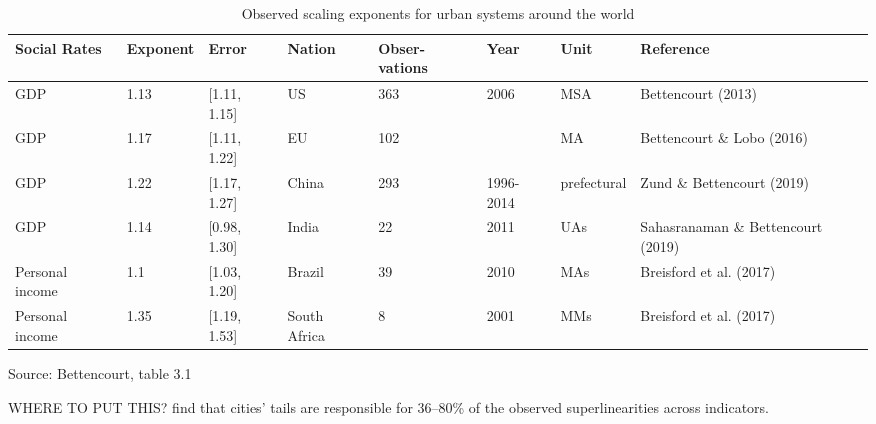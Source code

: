 \begin{table}[htb]\small
\centering
\begin{tabular}{|p{1.5cm}|l|l|p{1.5cm}|p{1.4cm}|p{}|l|p{2.5cm}|}\hline
\textbf{Social Rates} & \textbf{Exponent} & \textbf{Error} & \textbf{Nation} & \textbf{Obser-vations} & \textbf{Year} & \textbf{Unit} & \textbf{Reference} \\ \hline   
GDP             & 1.13 & [1.11, 1.15]  & US           & 363 & 2006        & MSA  & Bettencourt (2013)                 \\ \hline
GDP             & 1.17 & [1.11, 1.22]  & EU           & 102 &             & MA   & Bettencourt  \& Lobo        (2016) \\ \hline
GDP             & 1.22 & [1.17, 1.27]  & China        & 293 & 1996-2014   & prefectural & Zund  \& Bettencourt (2019) \\ \hline
GDP             & 1.14 & [0.98, 1.30]  & India        & 22  & 2011        & UAs  & Sahasranaman \& Bettencourt (2019) \\ \hline
Personal income & 1.1  & [1.03, 1.20]  & Brazil       & 39  & 2010        & MAs  & Breisford et al.  (2017)           \\ \hline
Personal income & 1.35 & [1.19, 1.53]  & South Africa & 8   & 2001        & MMs  & Breisford et al.  (2017)           \\ \hline
\end{tabular}
\caption[Observed scaling exponents]{Observed scaling exponents for urban systems around the world}
\label{table-scaling-exponents}
\small Source: Bettencourt, table 3.1
\end{table}

WHERE TO PUT THIS? \cite{arvidssonUrbanScalingLaws2023} find that cities' tails are responsible for 36--80\% of the observed superlinearities across indicators. 




